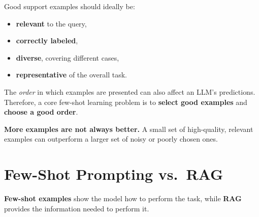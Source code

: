 \documentclass[11pt]{article}
\begin{document}
Good support examples should ideally be:

\begin{itemize}[leftmargin=1.4em, noitemsep]
  \item \textbf{relevant} to the query,
  \item \textbf{correctly labeled},
  \item \textbf{diverse}, covering different cases,
  \item \textbf{representative} of the overall task.
\end{itemize}

The \emph{order} in which examples are presented can also affect an LLM's predictions. Therefore, a core few-shot learning problem is to \textbf{select good examples} and \textbf{choose a good order}.

\begin{warnbox}
\textbf{More examples are not always better.} A small set of high-quality, relevant examples can outperform a larger set of noisy or poorly chosen ones.
\end{warnbox}


\section*{Few-Shot Prompting vs.\ RAG}

\textbf{Few-shot examples} show the model how to perform the task, while \textbf{RAG} provides the information needed to perform it.
\end{document}
